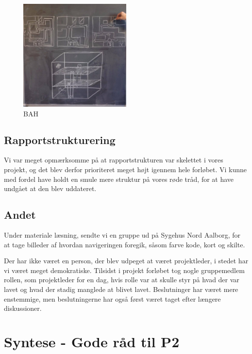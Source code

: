 \documentclass[a4paper,12pt,oneside,article]{memoir}
\begin{document}
        \begin{figure}[ht!]
            \centering
            \includegraphics[width=0.5\textwidth]{Images/6.jpg}
            \caption{BAH}
            \label{fig:floor_tegninger}
        \end{figure}

        \subsection{Rapportstrukturering}

        Vi var meget opmærksomme på at rapportstrukturen var skelettet i vores projekt, og det blev derfor prioriteret meget højt igennem hele forløbet. Vi kunne med fordel have holdt en smule mere struktur på vores røde tråd, for at have undgået at den blev uddateret.


        \subsection{Andet}
        Under materiale læsning, sendte vi en gruppe ud på Sygehus Nord Aalborg, for at tage billeder af hvordan navigeringen foregik, såsom farve kode, kort og skilte.

        Der har ikke været en person, der blev udpeget at været projektleder, i stedet har vi været meget demokratiske. Tilsidst i projekt forløbet tog nogle gruppemedlem rollen, som projektleder for en dag, hvis rolle var at skulle styr på hvad der var lavet og hvad der stadig manglede at blivet lavet. Beslutninger har været mere enstemmige, men beslutningerne har også først været taget efter længere diskussioner.

    \section{Syntese - Gode råd til P2}
\end{document}
